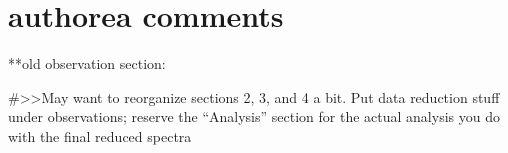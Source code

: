 \section{authorea comments}

**old observation section:

#>>May want to reorganize sections 2, 3, and 4 a bit. Put data reduction stuff under observations; reserve the “Analysis” section for the actual analysis you do with the final reduced spectra














